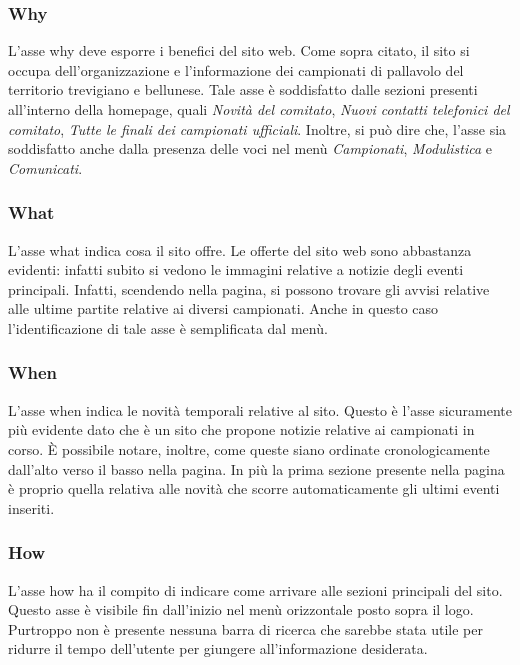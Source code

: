 	\subsubsection{Why}
	L'asse why deve esporre i benefici del sito web. Come sopra citato, il sito si
	occupa dell'organizzazione e l'informazione dei campionati di pallavolo 
	del territorio trevigiano e bellunese. Tale asse è soddisfatto dalle sezioni 
	presenti all'interno della homepage, quali \textit{Novità del comitato}, 
	\textit{Nuovi contatti telefonici del comitato}, \textit{Tutte le finali dei 
	campionati ufficiali}. Inoltre, si può dire che, l'asse sia soddisfatto anche
	dalla presenza delle voci nel menù \textit{Campionati}, \textit{Modulistica} e 
	\textit{Comunicati}. 
	
	\subsubsection{What}
	L'asse what indica cosa il sito offre. Le offerte del sito web sono abbastanza
	evidenti: infatti subito si vedono le immagini relative a notizie degli 
	eventi principali. Infatti, scendendo nella pagina, si possono trovare
	gli avvisi relative alle ultime partite relative ai diversi campionati.
	Anche in questo caso l'identificazione di tale asse è semplificata dal
	menù.
	
	\subsubsection{When}
	L'asse when indica le novità temporali relative al sito. Questo è l'asse
	sicuramente più evidente dato che è un sito che propone notizie relative ai 
	campionati in corso. È possibile notare, inoltre, come queste siano ordinate
	cronologicamente dall'alto verso il basso nella pagina. In più la prima sezione
	presente nella pagina è proprio quella relativa alle novità che scorre 
	automaticamente gli ultimi eventi inseriti.
	
	\subsubsection{How}
	L'asse how ha il compito di indicare come arrivare alle sezioni principali del
	sito. Questo asse è visibile fin dall'inizio nel menù orizzontale posto sopra
	il logo. Purtroppo non è presente nessuna barra di ricerca che sarebbe stata 
	utile per ridurre il tempo dell'utente per giungere all'informazione desiderata.
	
